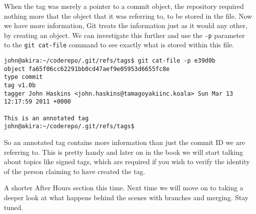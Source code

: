 When the tag was merely a pointer to a commit object, the repository required nothing more that the object that it was referring to, to be stored in the file.  Now we have more information, Git treats the information just as it would any other, by creating an object.  We can investigate this further and use the \texttt{-p} parameter to the \texttt{git cat-file} command to see exactly what is stored within this file.

\begin{Verbatim}[frame=leftline,framerule=1mm,fontsize=\relsize{-3}] 
john@akira:~/coderepo/.git/refs/tags$ git cat-file -p e39d0b
object fa65f06cc62291bb0cd47aef9e05953d6655fc8e
type commit
tag v1.0b
tagger John Haskins <john.haskins@tamagoyakiinc.koala> Sun Mar 13 12:17:59 2011 +0000

This is an annotated tag
john@akira:~/coderepo/.git/refs/tags$ 
\end{Verbatim}

So an annotated tag contains more information than just the commit ID we are referring to.  This is pretty handy and later on in the book we will start talking about topics like signed tags, which are required if you wish to verify the identity of the person claiming to have created the tag.

A shorter After Hours section this time.  Next time we will move on to taking a deeper look at what happens behind the scenes with branches and merging.  Stay tuned.
